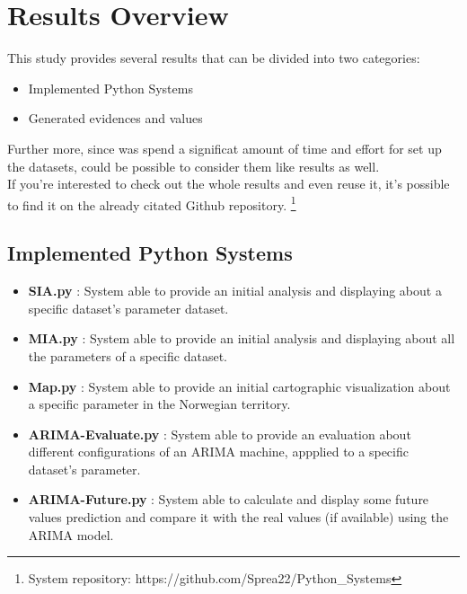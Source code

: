 \chapter{Results Overview}
This study provides several results that can be divided into two categories:
\vspace{-5mm}
\begin{itemize}
 \setlength{\itemsep}{-5pt} 
\item Implemented Python Systems
\item Generated evidences and values
\end{itemize}

Further more, since was spend a significat amount of time and effort for set up the datasets, could be possible to consider them like results as well.\\
If you're interested to check out the whole results and even reuse it, it's possible to find it on the already citated Github repository. \footnote{System repository: https://github.com/Sprea22/Python\_Systems}

\section{Implemented Python Systems}
\vspace{-5mm}
\begin{itemize}
 \setlength{\itemsep}{-5pt} 
\item \textbf{SIA.py} : System able to provide an initial analysis and displaying about a specific dataset's parameter dataset.
\item \textbf{MIA.py} : System able to provide an initial analysis and displaying about all the parameters of a specific dataset.
\item \textbf{Map.py} : System able to provide an initial cartographic visualization about a specific parameter in the Norwegian territory.
\item \textbf{ARIMA-Evaluate.py} : System able to provide an evaluation about different configurations of an ARIMA machine, appplied to a specific dataset's parameter.
\item \textbf{ARIMA-Future.py} : System able to calculate and display some future values prediction and compare it with the real values (if available) using the ARIMA model.
\end{itemize}

\newpage

